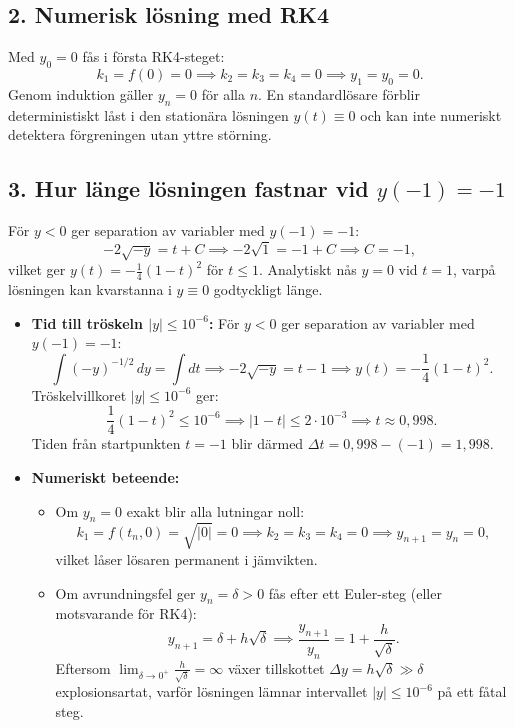 \documentclass{article}
\begin{document}
\subsection*{2. Numerisk lösning med RK4}
Med $y_0 = 0$ fås i första RK4-steget:
\begin{equation}
    k_1 = f(0) = 0 \implies k_2 = k_3 = k_4 = 0 \implies y_1 = y_0 = 0.
\end{equation}
Genom induktion gäller $y_n = 0$ för alla $n$. En standardlösare förblir deterministiskt låst i den stationära lösningen $y(t) \equiv 0$ och kan inte numeriskt detektera förgreningen utan yttre störning.

\subsection*{3. Hur länge lösningen fastnar vid $y(-1) = -1$}
För $y < 0$ ger separation av variabler med $y(-1) = -1$:
\begin{equation}
    -2\sqrt{-y} = t + C \implies -2\sqrt{1} = -1 + C \implies C = -1,
\end{equation}
vilket ger $y(t) = -\frac{1}{4}(1 - t)^2$ för $t \le 1$. Analytiskt nås $y = 0$ vid $t = 1$, varpå lösningen kan kvarstanna i $y \equiv 0$ godtyckligt länge.

\begin{itemize}
    \item \textbf{Tid till tröskeln $|y| \le 10^{-6}$:}
    För $y < 0$ ger separation av variabler med $y(-1) = -1$:
    \[
    \int (-y)^{-1/2}\,dy = \int dt \implies -2\sqrt{-y} = t - 1 \implies y(t) = -\frac{1}{4}(1 - t)^2.
    \]
    Tröskelvillkoret $|y| \le 10^{-6}$ ger:
    \[
    \frac{1}{4}(1 - t)^2 \le 10^{-6} \implies |1 - t| \le 2 \cdot 10^{-3} \implies t \approx 0{,}998.
    \]
    Tiden från startpunkten $t = -1$ blir därmed $\Delta t = 0{,}998 - (-1) = 1{,}998$.

    \item \textbf{Numeriskt beteende:}
    \begin{itemize}
        \item Om $y_n = 0$ exakt blir alla lutningar noll:
        \[
        k_1 = f(t_n, 0) = \sqrt{|0|} = 0 \implies k_2 = k_3 = k_4 = 0 \implies y_{n+1} = y_n = 0,
        \]
        vilket låser lösaren permanent i jämvikten.
        \item Om avrundningsfel ger $y_n = \delta > 0$ fås efter ett Euler-steg (eller motsvarande för RK4):
        \[
        y_{n+1} = \delta + h\sqrt{\delta} \implies \frac{y_{n+1}}{y_n} = 1 + \frac{h}{\sqrt{\delta}}.
        \]
        Eftersom $\lim_{\delta \to 0^+} \frac{h}{\sqrt{\delta}} = \infty$ växer tillskottet $\Delta y = h\sqrt{\delta} \gg \delta$ explosionsartat, varför lösningen lämnar intervallet $|y| \le 10^{-6}$ på ett fåtal steg.
    \end{itemize}
\end{itemize}
\end{document}
